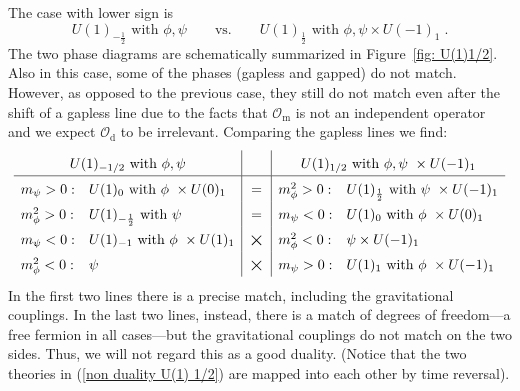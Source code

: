 \documentclass[a4paper, 12pt]{article}
\numberwithin{equation}{section}
\newcommand{\be}{\begin{equation}} \newcommand{\ee}{\end{equation}}
\newcommand{\cO}{\mathcal{O}}
\begin{document}
The case with lower sign is
\be
\label{non duality U(1) 1/2}
U(1)_{-\frac12} \text{ with } \phi,\psi \qquad\text{vs.}\qquad U(1)_{\frac12} \text{ with } \phi,\psi \times U(-1)_1 \;.
\ee
The two phase diagrams are schematically summarized in Figure~\ref{fig: U(1)1/2}. Also in this case, some of the phases (gapless and gapped) do not match. However, as opposed to the previous case, they still do not match even after the shift of a gapless line due to the facts that $\cO_\text{m}$ is not an independent operator and we expect $\cO_\text{d}$ to be irrelevant. Comparing the gapless lines we find:
\be
\label{phase diagram U(1) 1/2 with phi psi}
{\renewcommand{\arraystretch}{1.5}
\begin{array}{ll|c|ll}
\multicolumn{2}{c|}{U(1)_{-1/2} \text{ with } \phi,\psi} & & \multicolumn{2}{c}{U(1)_{1/2} \text{ with $\phi,\psi$ } \times U(-1)_1} \\
\hline
m_\psi>0: & U(1)_0 \text{ with $\phi$ } \times U(0)_1 & = & m_\phi^2>0: & U(1)_{\frac12} \text{ with $\psi$ } \times U(-1)_1 \\
m_\phi^2>0: & U(1)_{-\frac12} \text{ with $\psi$} & = & m_\psi<0: & U(1)_0 \text{ with $\phi$ } \times U(0)_1 \\
m_\psi<0: & U(1)_{-1} \text{ with $\phi$ } \times U(1)_1 & \raisebox{-.1em}{\text{\Large$\times$}} & m_\phi^2<0: & \psi \times U(-1)_1 \\
m_\phi^2<0: & \psi & \raisebox{-.1em}{\text{\Large$\times$}} & m_\psi>0: & U(1)_1 \text{ with $\phi$ } \times U(-1)_1
\end{array}}
\ee
In the first two lines there is a precise match, including the gravitational couplings. In the last two lines, instead, there is a match of degrees of freedom---a free fermion in all cases---but the gravitational couplings do not match on the two sides. Thus, we will not regard this as a good duality. (Notice that the two theories in (\ref{non duality U(1) 1/2}) are mapped into each other by time reversal).
\end{document}
